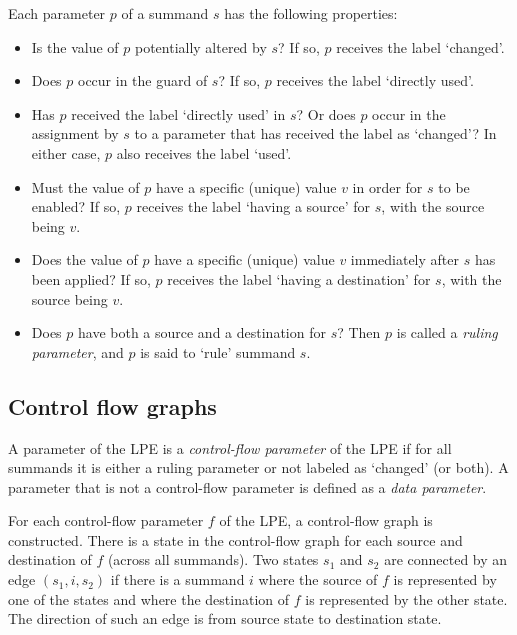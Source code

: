 Each parameter $p$ of a summand $s$ has the following properties:
\begin{itemize}

\item Is the value of $p$ potentially altered by $s$?
If so, $p$ receives the label `changed'.

\item Does $p$ occur in the guard of $s$?
If so, $p$ receives the label `directly used'.

\item Has $p$ received the label `directly used' in $s$?
Or does $p$ occur in the assignment by $s$ to a parameter that has received the label as `changed'?
In either case, $p$ also receives the label `used'.

\item Must the value of $p$ have a specific (unique) value $v$ in order for $s$ to be enabled?
If so, $p$ receives the label `having a source' for $s$, with the source being $v$.

\item Does the value of $p$ have a specific (unique) value $v$ immediately after $s$ has been applied?
If so, $p$ receives the label `having a destination' for $s$, with the source being $v$.

\item Does $p$ have both a source and a destination for $s$?
Then $p$ is called a \emph{ruling parameter}, and $p$ is said to `rule' summand $s$.

\end{itemize}

\subsection{Control flow graphs}

A parameter of the LPE is a \emph{control-flow parameter} of the LPE if for all summands it is either a ruling parameter or not labeled as `changed' (or both).
A parameter that is not a control-flow parameter is defined as a \emph{data parameter}.

\vspace{1mm}

For each control-flow parameter $f$ of the LPE, a control-flow graph is constructed.
There is a state in the control-flow graph for each source and destination of $f$ (across all summands).
Two states $s_1$ and $s_2$ are connected by an edge $(s_1, i, s_2)$ if there is a summand $i$ where the source of $f$ is represented by one of the states and where the destination of $f$ is represented by the other state.
The direction of such an edge is from source state to destination state.


